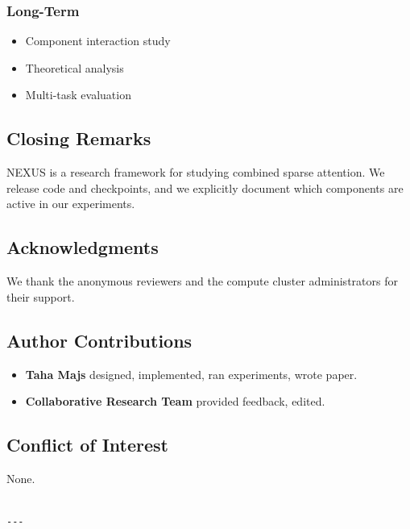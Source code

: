 \subsubsection{Long-Term}
\begin{itemize}
\item Component interaction study
\item Theoretical analysis
\item Multi-task evaluation

\end{itemize}
\subsection{Closing Remarks}

NEXUS is a research framework for studying combined sparse attention. We 
release code and checkpoints, and we explicitly document which components 
are active in our experiments.

\subsection{Acknowledgments}

We thank the anonymous reviewers and the compute cluster administrators for their support.

\subsection{Author Contributions}

\begin{itemize}
\item \textbf{Taha Majs} designed, implemented, ran experiments, wrote paper.
\item \textbf{Collaborative Research Team} provided feedback, edited.

\end{itemize}
\subsection{Conflict of Interest}

None.
\begin{lstlisting}

---
\end{lstlisting}